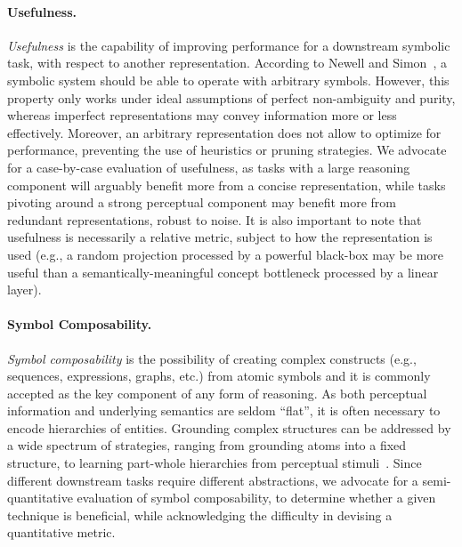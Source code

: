 \paragraph{Usefulness.} \textit{Usefulness} is the capability of improving performance for a downstream symbolic task, with respect to another representation. According to Newell and Simon~\cite{newell1972human}, a symbolic system should be able to operate with arbitrary symbols. However, this property only works under ideal assumptions of perfect non-ambiguity and purity, whereas imperfect representations may convey information more or less effectively. Moreover, an arbitrary representation does not allow to optimize for performance, preventing the use of heuristics or pruning strategies.
%
We advocate for a case-by-case evaluation of usefulness, as tasks with a large reasoning component will arguably benefit more from a concise representation, while tasks pivoting around a strong perceptual component may benefit more from redundant representations, robust to noise. It is also important to note that usefulness is necessarily a relative metric, subject to how the representation is used (e.g., a random projection processed by a powerful black-box may be more useful than a semantically-meaningful concept bottleneck processed by a linear layer). %

\paragraph{Symbol Composability.} \textit{Symbol composability} is the possibility of creating complex constructs (e.g., sequences, expressions, graphs, etc.) from atomic symbols and it is commonly accepted as the key component of any form of reasoning. As both perceptual information and underlying semantics are seldom ``flat'', it is often necessary to encode hierarchies of entities. Grounding complex structures can be addressed by a wide spectrum of strategies, ranging from grounding atoms into a fixed structure, to learning part-whole hierarchies from perceptual stimuli~\cite{greff2020binding}. Since different downstream tasks require different abstractions, we advocate for a semi-quantitative evaluation of symbol composability, to determine whether a given technique is beneficial, while acknowledging the difficulty in devising a quantitative metric.


